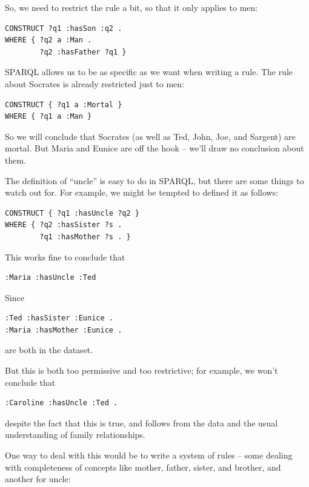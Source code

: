 So, we need to restrict the rule a bit, so that it only applies to men:

\begin{lstlisting}
CONSTRUCT ?q1 :hasSon :q2 .
WHERE { ?q2 a :Man .
        ?q2 :hasFather ?q1 }
\end{lstlisting} 


SPARQL allows us to be as specific as we want when writing a rule. The
rule about Socrates is already restricted just to men:

\begin{lstlisting}
CONSTRUCT { ?q1 a :Mortal }
WHERE { ?q1 a :Man }
\end{lstlisting}

So we will conclude that Socrates (as well as Ted, John, Joe, and
Sargent) are mortal. But Maria and 
Eunice are off the hook -- we'll draw no conclusion about them.

The definition of ``uncle'' is easy to do in SPARQL, but there are some 
things to watch out for.  For example, we might be tempted to defined it as follows: 

\begin{lstlisting}
CONSTRUCT { ?q1 :hasUncle ?q2 }
WHERE { ?q2 :hasSister ?s .
        ?q1 :hasMother ?s . }
\end{lstlisting}

This works fine to conclude that

\begin{lstlisting}
:Maria :hasUncle :Ted 
\end{lstlisting}

Since

\begin{lstlisting}
:Ted :hasSister :Eunice .
:Maria :hasMother :Eunice .
\end{lstlisting}

are both in the dataset. 

But this is both too permissive and too restrictive; for example, we
won't conclude that

\begin{lstlisting}
:Caroline :hasUncle :Ted .
\end{lstlisting}

despite the fact that this is true, and follows from the data and the usual understanding of family relationships.


One way to deal with this would be to write a system of rules -- some
dealing with completeness of concepts like mother, father, sister, and
brother, and another for uncle:

